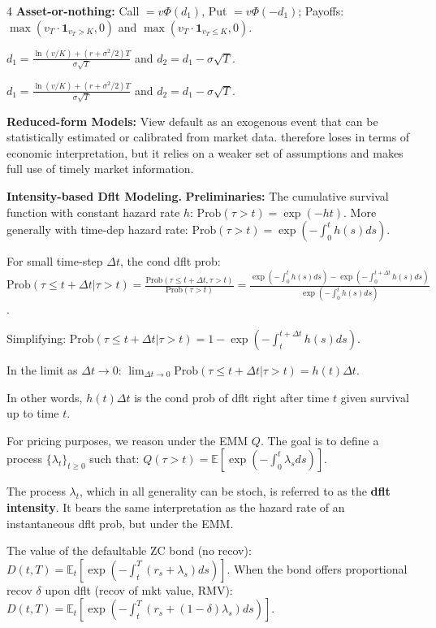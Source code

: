 \documentclass[landscape]{article}
\begin{document}
\begin{multicols}{4}
\textbf{Asset-or-nothing:} Call $= v\Phi(d_1)$, Put $= v\Phi(-d_1)$; Payoffs: $\max(v_T \cdot \mathbf{1}_{v_T>K}, 0)$ and $\max(v_T \cdot \mathbf{1}_{v_T \leq K}, 0)$.

$d_1 = \frac{\ln(v/K) + (r + \sigma^2/2)T}{\sigma\sqrt{T}}$ and $d_2 = d_1 - \sigma\sqrt{T}$.

$d_1 = \frac{\ln(v/K) + (r + \sigma^2/2)T}{\sigma\sqrt{T}}$ and $d_2 = d_1 - \sigma\sqrt{T}$.

\textcolor{sectioncolor}{\textbf{Reduced-form Models:}}
View default as an exogenous event that can be statistically estimated or calibrated from market data.
therefore loses in terms of economic interpretation, but it relies on a weaker set of assumptions 
and makes full use of timely market information.

\textcolor{subsectioncolor}{\textbf{Intensity-based Dflt Modeling.}}
\textcolor{subsubsectioncolor}{\textbf{Preliminaries:}} The cumulative survival function with constant hazard rate $h$: $\text{Prob}(\tau > t) = \exp(-ht)$. More generally with time-dep hazard rate: $\text{Prob}(\tau > t) = \exp\left(-\int_0^t h(s)ds\right)$.

For small time-step $\Delta t$, the cond dflt prob: $\text{Prob}(\tau \leq t + \Delta t | \tau > t) = \frac{\text{Prob}(\tau \leq t + \Delta t, \tau > t)}{\text{Prob}(\tau > t)} = \frac{\exp\left(-\int_0^t h(s)ds\right) - \exp\left(-\int_0^{t+\Delta t} h(s)ds\right)}{\exp\left(-\int_0^t h(s)ds\right)}$.

Simplifying: $\text{Prob}(\tau \leq t + \Delta t | \tau > t) = 1 - \exp\left(-\int_t^{t+\Delta t} h(s)ds\right)$.

In the limit as $\Delta t \to 0$: $\lim_{\Delta t \to 0} \text{Prob}(\tau \leq t + \Delta t | \tau > t) = h(t)\Delta t$.

In other words, $h(t)\Delta t$ is the cond prob of dflt right after time $t$ given survival up to time $t$.

For pricing purposes, we reason under the EMM $Q$. The goal is to define a process $\{\lambda_t\}_{t \geq 0}$ such that: $Q(\tau > t) = \mathbb{E}\left[\exp\left(-\int_0^t \lambda_s ds\right)\right]$.

The process $\lambda_t$, which in all generality can be stoch, is referred to as the \textbf{dflt intensity}. It bears the same interpretation as the hazard rate of an instantaneous dflt prob, but under the EMM.

The value of the defaultable ZC bond (no recov): $D(t,T) = \mathbb{E}_t\left[\exp\left(-\int_t^T (r_s + \lambda_s)ds\right)\right]$. When the bond offers proportional recov $\delta$ upon dflt (recov of mkt value, RMV): $D(t,T) = \mathbb{E}_t\left[\exp\left(-\int_t^T (r_s + (1-\delta)\lambda_s)ds\right)\right]$.


\end{multicols}
\end{document}
